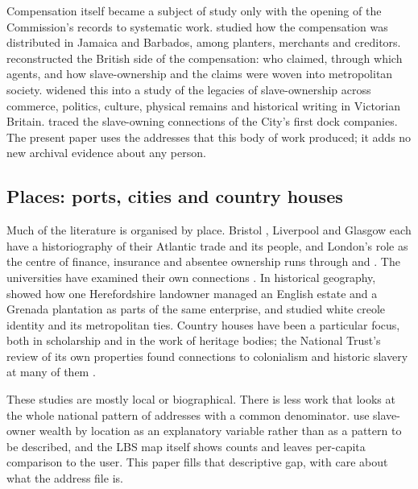 \documentclass[11pt,a4paper]{article}
\begin{document}
Compensation itself became a subject of study only with the opening of the Commission's records to systematic work. \citet{butler1995} studied how the compensation was distributed in Jamaica and Barbados, among planters, merchants and creditors. \citet{draper2007,draper2010} reconstructed the British side of the compensation: who claimed, through which agents, and how slave-ownership and the claims were woven into metropolitan society. \citet{hall2014} widened this into a study of the legacies of slave-ownership across commerce, politics, culture, physical remains and historical writing in Victorian Britain. \citet{draper2008} traced the slave-owning connections of the City's first dock companies. The present paper uses the addresses that this body of work produced; it adds no new archival evidence about any person.

\subsection{Places: ports, cities and country houses}
Much of the literature is organised by place. Bristol \citep{dresser2001}, Liverpool \citep{richardson2007} and Glasgow \citep{mullen2022,devine2015} each have a historiography of their Atlantic trade and its people, and London's role as the centre of finance, insurance and absentee ownership runs through \citet{draper2010} and \citet{donington2019}. The universities have examined their own connections \citep{mullen2021}. In historical geography, \citet{seymour1998} showed how one Herefordshire landowner managed an English estate and a Grenada plantation as parts of the same enterprise, and \citet{lambert2005} studied white creole identity and its metropolitan ties. Country houses have been a particular focus, both in scholarship \citep{dresser2013,smith2006} and in the work of heritage bodies; the National Trust's review of its own properties found connections to colonialism and historic slavery at many of them \citep{huxtable2020}.

These studies are mostly local or biographical. There is less work that looks at the whole national pattern of addresses with a common denominator. \citet{heblich2022} use slave-owner wealth by location as an explanatory variable rather than as a pattern to be described, and the LBS map itself shows counts and leaves per-capita comparison to the user. This paper fills that descriptive gap, with care about what the address file is.
\end{document}
